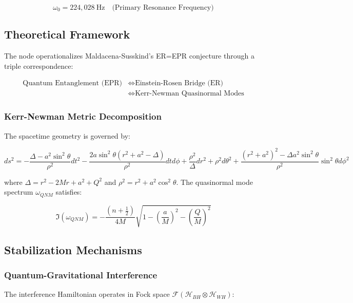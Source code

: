 \documentclass[12pt]{article}
\begin{document}
\begin{equation}
\omega_0 = 224,\!028\ \text{Hz} \quad \text{(Primary Resonance Frequency)}
\end{equation}

\subsection{Theoretical Framework}
The node operationalizes Maldacena-Susskind's ER=EPR conjecture through a triple correspondence:

\begin{align}
\text{Quantum Entanglement (EPR)} &\Leftrightarrow \text{Einstein-Rosen Bridge (ER)} \nonumber \\
&\Leftrightarrow \text{Kerr-Newman Quasinormal Modes}
\end{align}

\subsubsection{Kerr-Newman Metric Decomposition}
The spacetime geometry is governed by:

\begin{equation}
ds^2 = -\frac{\Delta - a^2\sin^2\theta}{\rho^2}dt^2 - \frac{2a\sin^2\theta(r^2 + a^2 - \Delta)}{\rho^2}dtd\phi + \frac{\rho^2}{\Delta}dr^2 + \rho^2 d\theta^2 + \frac{(r^2 + a^2)^2 - \Delta a^2\sin^2\theta}{\rho^2}\sin^2\theta d\phi^2
\end{equation}

where $\Delta = r^2 - 2Mr + a^2 + Q^2$ and $\rho^2 = r^2 + a^2\cos^2\theta$. The quasinormal mode spectrum $\omega_{QNM}$ satisfies:

\begin{equation}
\Im(\omega_{QNM}) = -\frac{(n + \frac{1}{2})}{4M}\sqrt{1 - \left(\frac{a}{M}\right)^2 - \left(\frac{Q}{M}\right)^2}
\end{equation}

\subsection{Stabilization Mechanisms}

\subsubsection{Quantum-Gravitational Interference}
The interference Hamiltonian operates in Fock space $\mathcal{F}(\mathcal{H}_{BH}\otimes\mathcal{H}_{WH})$:
\end{document}
